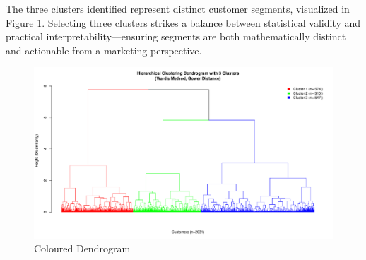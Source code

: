 The three clusters identified represent distinct customer segments, visualized in Figure \ref{fig:cdend}. Selecting three clusters strikes a balance between statistical validity and practical interpretability—ensuring segments are both mathematically distinct and actionable from a marketing perspective.

\begin{figure}[H]
    \centering
    \includegraphics[width=1\linewidth]{Imatges/dendrogram_Gower_Ward_Colored.pdf}
    \caption{Coloured Dendrogram}
    \label{fig:cdend}
\end{figure}
